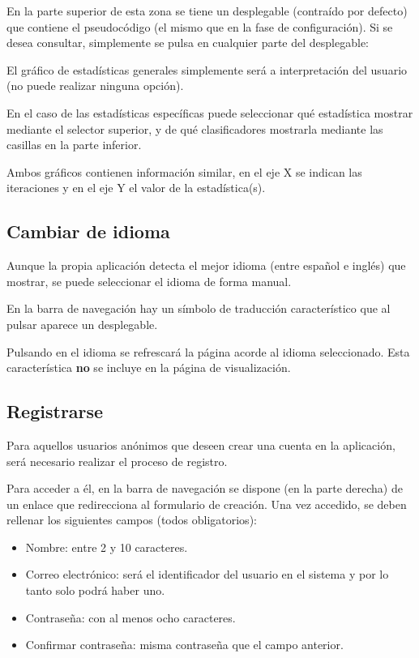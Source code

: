 En la parte superior de esta zona se tiene un desplegable (contraído por
defecto) que contiene el pseudocódigo (el mismo que en la fase de
configuración). Si se desea consultar, simplemente se pulsa en cualquier parte
del desplegable:


El gráfico de estadísticas generales simplemente será a interpretación del
usuario (no puede realizar ninguna opción). 

En el caso de las estadísticas específicas puede seleccionar qué estadística
mostrar mediante el selector superior, y de qué clasificadores mostrarla
mediante las casillas en la parte inferior.

Ambos gráficos contienen información similar, en el eje X se indican las
iteraciones y en el eje Y el valor de la estadística(s).

\subsection{Cambiar de idioma}

Aunque la propia aplicación detecta el mejor idioma (entre español e inglés) que
mostrar, se puede seleccionar el idioma de forma manual.

En la barra de navegación hay un símbolo de traducción característico que al
pulsar aparece un desplegable.


Pulsando en el idioma se refrescará la página acorde al idioma seleccionado.
Esta característica \textbf{no} se incluye en la página de visualización.

\subsection{Registrarse}

Para aquellos usuarios anónimos que deseen crear una cuenta en la aplicación,
será necesario realizar el proceso de registro.

Para acceder a él, en la barra de navegación se dispone (en la parte derecha) de
un enlace que redirecciona al formulario de creación. Una vez accedido, se deben
rellenar los siguientes campos (todos obligatorios):
\begin{itemize}
    \item Nombre: entre 2 y 10 caracteres.
    \item Correo electrónico: será el identificador del usuario en el sistema y
    por lo tanto solo podrá haber uno.
    \item Contraseña: con al menos ocho caracteres.
    \item Confirmar contraseña: misma contraseña que el campo anterior.
\end{itemize}

